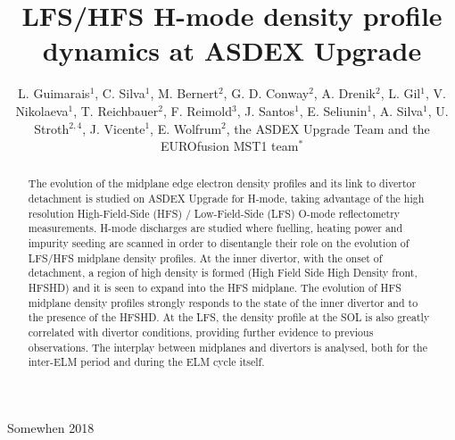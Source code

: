 \documentclass[12pt]{iopart}
\begin{document}
\title[LFS/HFS H-mode density profile dynamics at ASDEX Upgrade]{LFS/HFS H-mode density profile dynamics at ASDEX Upgrade}
\author{L. Guimarais$^1$, C. Silva$^1$, M. Bernert$^2$, G. D. Conway$^2$, A. Drenik$^2$, L. Gil$^1$, V. Nikolaeva$^{1}$, T. Reichbauer$^2$, F. Reimold$^3$, J. Santos$^1$, E. Seliunin$^1$, A. Silva$^1$, U. Stroth$^{2,4}$, J. Vicente$^1$, E. Wolfrum$^2$, the ASDEX Upgrade Team and the EUROfusion MST1 team$^*$}

\address{$^1$ Instituto de Plasmas e Fus\~ao Nuclear, Instituto Superior T\'ecnico, Universidade de Lisboa, Portugal}
\address{$^2$ Max-Planck-Institut f\"ur Plasmaphysik, Boltzmannstr. 2, 85748, Garching, Germany}
\address{$^3$ Forschungszentrum J\"ulich GmbH, Wilhelm-Johnen-Stra{\ss}e, 52425 J\"ulich, Germany}
\address{Physik-Department E28, Technische Universit\"at M\"unchen, James-Franck-Str. 1, 85748 Garching, Germany}
\begin{center}
\address{$^*$ 
See the author list of Meyer et al, Overview of progress in European Medium Sized Tokamaks towards an integrated plasma-edge/wall solution, accepted for publication in Nuclear Fusion}
\end{center}

\vspace{10pt}
\begin{indented}
\item[]Somewhen 2018
\end{indented}

\begin{abstract}
\label{sec:abstract}
The evolution of the midplane edge electron density profiles and its link to divertor detachment is studied on ASDEX Upgrade for H-mode, taking advantage of the high resolution High-Field-Side (HFS) / Low-Field-Side (LFS) O-mode reflectometry measurements. H-mode discharges are studied where fuelling, heating power and impurity seeding are scanned in order to disentangle their role on the evolution of LFS/HFS midplane density profiles. At the inner divertor, with the onset of detachment, a region of high density is formed (High Field Side High Density front, HFSHD) and it is seen to expand into the HFS midplane. The evolution of HFS midplane density profiles strongly responds to the state of the inner divertor and to the presence of the HFSHD. At the LFS, the density profile at the SOL is also greatly correlated with divertor conditions, providing further evidence to previous observations. The interplay between midplanes and divertors is analysed, both for the inter-ELM period and during the ELM cycle itself. 
\end{abstract}
\end{document}
